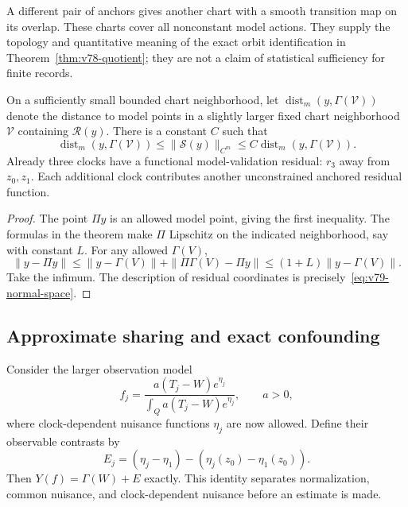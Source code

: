 A different pair of anchors gives another chart with a smooth transition
map on its overlap.  These charts cover all nonconstant model actions.
They supply the topology and quantitative meaning of the exact orbit
identification in Theorem~\ref{thm:v78-quotient}; they are not a claim
of statistical sufficiency for finite records.

\begin{corollary}
\label{cor:v79-residual-distance}
On a sufficiently small bounded chart neighborhood, let
$\operatorname{dist}_m(y,\Gamma(\mathcal V))$ denote the distance to
model points in a slightly larger fixed chart neighborhood $\mathcal V$
containing $\mathcal R(y)$.  There is a constant $C$ such that
\[
 \operatorname{dist}_m(y,\Gamma(\mathcal V))
       \le\|\mathcal S(y)\|_{C^m}
       \le C\operatorname{dist}_m(y,\Gamma(\mathcal V)).
\]
Already three clocks have a functional model-validation residual:
$r_3$ away from $z_0,z_1$.  Each additional clock contributes another
unconstrained anchored residual function.
\end{corollary}
\begin{proof}
The point $\Pi y$ is an allowed model point, giving the first inequality.
The formulas in the theorem make $\Pi$ Lipschitz on the indicated
neighborhood, say with constant $L$.  For any allowed $\Gamma(V)$,
\[
 \|y-\Pi y\|\le\|y-\Gamma(V)\|
                  +\|\Pi\Gamma(V)-\Pi y\|
              \le(1+L)\|y-\Gamma(V)\|.
\]
Take the infimum.  The description of residual coordinates is
precisely~\eqref{eq:v79-normal-space}.
\end{proof}

\subsection{Approximate sharing and exact confounding}

Consider the larger observation model
\begin{equation}\label{eq:v79-misspecified}
 f_j=\frac{a(T_j-W)e^{\eta_j}}
              {\int_Qa(T_j-W)e^{\eta_j}},\qquad a>0,
\end{equation}
where clock-dependent nuisance functions $\eta_j$ are now allowed.
Define their observable contrasts by
\begin{equation}\label{eq:v79-nuisance-contrast}
 E_j=(\eta_j-\eta_1)-(\eta_j(z_0)-\eta_1(z_0)).
\end{equation}
Then $Y(f)=\Gamma(W)+E$ exactly.  This identity separates normalization,
common nuisance, and clock-dependent nuisance before an estimate is made.

